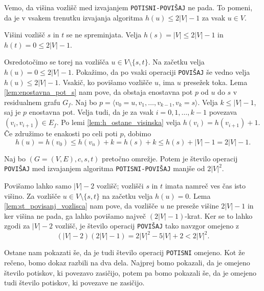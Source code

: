 \documentclass[mat1]{fmfdelo}
\begin{document}
\begin{opomba}
Vemo, da višina vozlišč med izvajanjem \texttt{POTISNI-POVIŠAJ} ne pada. To pomeni, da je v vsakem trenutku izvajanja algoritma $h(u) \leq 2|V| - 1$ za vsak $u \in V$.
\end{opomba}

\begin{dokaz}
Višini vozlišč $s$ in $t$ se ne spreminjata. Velja $h(s) = |V| \leq 2|V| -1$ in $h(t) = 0 \leq 2|V|-1$.

Osredotočimo se torej na vozlišča $u \in V \setminus \{s,t\}$. Na začetku velja $h(u) = 0 \leq 2|V|-1$. Pokažimo, da po vsaki operaciji \texttt{POVIŠAJ} še vedno velja $h(u) \leq 2|V|-1$. Vsakič, ko povišamo vozlišče $u$, ima $u$ presežek toka. Lema \ref{lem:enostavna_pot_s} nam pove, da obstaja enostavna pot $p$ od $u$ do $s$ v residualnem grafu $G_f$. Naj bo $p = \langle v_0 = u, v_1, \dotsc, v_{k-1}, v_k = s\rangle$. Velja $k \leq |V|-1$, saj je $p$ enostavna pot. Velja tudi, da je za vsak $i = 0,1,\dotsc,k-1$ povezava $(v_i, v_{i+1}) \in E_f$. Po lemi \ref{lem:h_ostane_visinska} velja $h(v_i) = h(v_{i+1}) +1$. Če združimo te enakosti po celi poti $p$, dobimo \[h(u) = h(v_0) \leq h(v_n) + k = h(s) + k \leq h(s) + |V| - 1 = 2|V| - 1.\]
\end{dokaz}

\begin{posledica}\label{pos:om_st_op_povisaj}
Naj bo $(G=(V,E),c,s,t)$ pretočno omrežje. Potem je število operacij \texttt{POVIŠAJ} med izvajanjem algoritma \texttt{POTISNI-POVIŠAJ} manjše od $2|V|^2$.
\end{posledica}

\begin{dokaz}
Povišamo lahko samo $|V| -2$ vozlišč; vozlišči $s$ in $t$ imata namreč ves čas isto višino. Za vozlišče $u \in V \setminus \{s,t\}$ na začetku velja $h(u) = 0$. Lema \ref{lem:st_povisanj_vozlisca} nam pove, da vozlišče $u$ ne preseže višine $2|V| - 1$ in ker višina ne pada, ga lahko povišamo največ $(2|V|-1)$-krat. Ker se to lahko zgodi za $|V|-2$ vozlišč, je število operacij \texttt{POVIŠAJ} tako navzgor omejeno z \[(|V|-2)(2|V|-1) = 2|V|^2 - 5|V| + 2 < 2|V|^2.\]
\end{dokaz}

Ostane nam pokazati še, da je tudi število operacij \texttt{POTISNI} omejeno. Kot že rečeno, bomo dokaz razbili na dva dela. Najprej bomo pokazali, da je omejeno število potiskov, ki povezavo zasičijo, potem pa bomo pokazali še, da je omejeno tudi število potiskov, ki povezave ne zasičijo.
\end{document}
